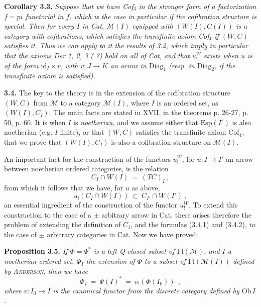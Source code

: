 \documentclass[11pt]{article}
\newcommand{\printedpage}[1]{\marginpar{\footnotesize p.~#1}}
\newcommand{\msp}[1]{\marginpar{\footnotesize [#1]}}
\newcommand{\M}{\mathcal{M}}
\newcommand{\Fl}{\mathrm{Fl}}
\newcommand{\Diag}{\mathrm{Diag}}
\newcommand{\id}{\mathrm{id}}
\newcommand{\Qs}{\tilde{\ }}
\begin{document}
\textbf{Corollary 3.3.} \textit{Suppose that we have Cof$_3$ in the stronger form of a factorization
\msp{page 37}
$f=pi$ \textup{functorial} in $f$, which is the case in particular if the cofibration structure is special. Then for every $I$ in \textup{Cat}, $\M(I)$ equipped with $(W(I),C(I))$ is a category with cofibrations, which satisfies the transfinite axiom Cof$_4$ if $(W,C)$ satisfies it. Thus we can apply to it the results of \textup{3.2}, which imply in particular that the axioms Der 1, 2, 3 ( ?) hold on all of \textup{Cat}, and that $u^{W}_{!}$ exists when $u$ is of the form $\id_I\times v$, with $v : J\longrightarrow K$ an arrow in \textup{$\Diag_1$} (resp. in \textup{$\Diag_2$}, if the transfinite axiom is satisfied).}

\textbf{3.4.} The key to the theory is in the extension of the cofibration structure $(W,C)$ from $\M$ to a category $\M(I)$, where $I$ is an ordered set, as $(W(I),C_I)$. The main facts are stated in XVII, in the theorems p. 26-27, p. 50, p. 60. It is when $I$ is \textit{noetherian,} and we assume either that $\mathrm{Esp}(I^{\circ})$ is also noetherian (e.g. $I$ finite), or that $(W,C)$ satisfies the transfinite axiom Cof$_4$, that we prove that $(W(I),C_I)$ is also a cofibration structure on $\M(I)$.

\msp{page 38}
An important fact for the construction of the functors $u^{W}_{!}$, for $u : I\longrightarrow I'$ an arrow between noetherian ordered categories, is the relation
\[
C_I\cap W(I) \ = \ (TC)_I \ , \tag*{(3.4.1)}
\]
from which it follows that we have, for $u$ as above,
\[
u_!(C_I\cap W(I)) \ \subset\ C_{I'}\cap W(I') \ , \tag*{(3.4.2)}
\]
an essential ingredient of the construction of the functor $u^{W}_{!}$. To extend this construction to the case of a $\pm$ arbitrary arrow in Cat, there arises therefore the problem of extending the definition of $C_I$, and the formulas (3.4.1) and (3.4.2), to the case of $\pm$ arbitrary categories in Cat. Now we have proved:

\textbf{Proposition 3.5.} \textit{If $\Phi=\Psi^*$ is a left \textup{Q-closed} subset of \textup{$\Fl(\M)$}, and $I$ a noetherian ordered set, $\Phi_I$ the extension of $\Phi$ to a subset of \textup{$\Fl(\M(I))$} defined by \textup{\textsc{Anderson}}, then we have}
\[
\Phi_I \ = \ \Psi(I)^* \ = \ v_!(\Phi(I_0))\Qs \ , \tag*{(3.5.1)}
\]
\textit{where $v : I_0\longrightarrow I$ is the canonical functor from the discrete category defined by \textup{$\mathrm{Ob}\,I$}.}

\printedpage{22}
\end{document}
